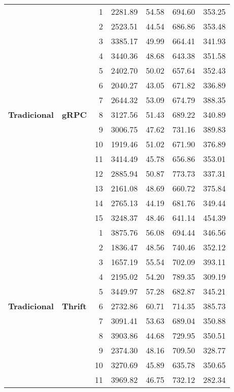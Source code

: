 \begin{longtable}{@{} llrrrrr @{}}
    \multirow{15}{*}{\textbf{Tradicional}} & \multirow{15}{*}{\textbf{gRPC}} 
        & 1 & 2281.89 & 54.58 & 694.60 & 353.25 \\
        & & 2 & 2523.51 & 44.54 & 686.86 & 353.48 \\
        & & 3 & 3385.17 & 49.99 & 664.41 & 341.93 \\
        & & 4 & 3440.36 & 48.68 & 643.38 & 351.58 \\
        & & 5 & 2402.70 & 50.02 & 657.64 & 352.43 \\
        & & 6 & 2040.27 & 43.05 & 671.82 & 336.89 \\
        & & 7 & 2644.32 & 53.09 & 674.79 & 388.35 \\
        & & 8 & 3127.56 & 51.43 & 689.22 & 340.89 \\
        & & 9 & 3006.75 & 47.62 & 731.16 & 389.83 \\
        & & 10 & 1919.46 & 51.02 & 671.90 & 376.89 \\
        & & 11 & 3414.49 & 45.78 & 656.86 & 353.01 \\
        & & 12 & 2885.94 & 50.87 & 773.73 & 337.31 \\
        & & 13 & 2161.08 & 48.69 & 660.72 & 375.84 \\
        & & 14 & 2765.13 & 44.19 & 681.76 & 349.44 \\
        & & 15 & 3248.37 & 48.46 & 641.14 & 454.39 \\
    \cline{2-7}
    \multirow{15}{*}{\textbf{Tradicional}} & \multirow{15}{*}{\textbf{Thrift}} 
        & 1 & 3875.76 & 56.08 & 694.44 & 346.56 \\
        & & 2 & 1836.47 & 48.56 & 740.46 & 352.12 \\
        & & 3 & 1657.19 & 55.54 & 702.09 & 393.11 \\
        & & 4 & 2195.02 & 54.20 & 789.35 & 309.19 \\
        & & 5 & 3449.97 & 57.28 & 682.87 & 345.21 \\
        & & 6 & 2732.86 & 60.71 & 714.35 & 385.73 \\
        & & 7 & 3091.41 & 53.63 & 689.04 & 350.88 \\
        & & 8 & 3903.86 & 44.68 & 729.95 & 350.51 \\
        & & 9 & 2374.30 & 48.16 & 709.50 & 328.77 \\
        & & 10 & 3270.69 & 45.89 & 635.78 & 350.65 \\
        & & 11 & 3969.82 & 46.75 & 732.12 & 282.34 \\

\end{longtable}
